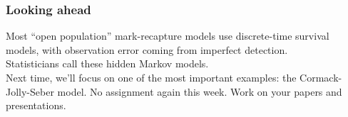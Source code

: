 \documentclass[color=usenames,dvipsnames]{beamer}\usepackage[]{graphicx}\usepackage[]{xcolor}
\begin{document}
\begin{frame}
  \frametitle{Looking ahead}
  Most ``open population'' mark-recapture models use discrete-time
  survival models, with observation error coming from imperfect
  detection. \\
  \pause
  \vfill
  Statisticians call these hidden Markov models. \\
  \pause
  \vfill
  Next time, we'll focus on one of the most important examples: the
  Cormack-Jolly-Seber model.
  \pause
  \vfill
  No assignment again this week. Work on your papers and
  presentations. 
\end{frame}












\end{document}
